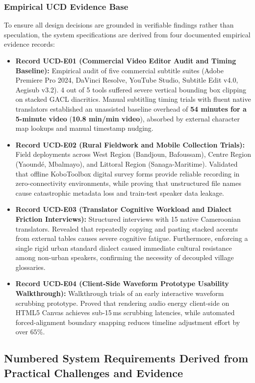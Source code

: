 \documentclass[a4paper,11pt]{article}
\begin{document}
\subsubsection{Empirical UCD Evidence Base}
\label{sec:chap3_ucd_evidence}
To ensure all design decisions are grounded in verifiable findings rather than speculation, the system specifications are derived from four documented empirical evidence records:
\begin{itemize}
    \item \textbf{Record UCD-E01 (Commercial Video Editor Audit and Timing Baseline):} Empirical audit of five commercial subtitle suites (Adobe Premiere Pro 2024, DaVinci Resolve, YouTube Studio, Subtitle Edit v4.0, Aegisub v3.2). 4 out of 5 tools suffered severe vertical bounding box clipping on stacked GACL diacritics. Manual subtitling timing trials with fluent native translators established an unassisted baseline overhead of \textbf{54 minutes for a 5-minute video} (\textbf{10.8 min/min video}), absorbed by external character map lookups and manual timestamp nudging.
    \item \textbf{Record UCD-E02 (Rural Fieldwork and Mobile Collection Trials):} Field deployments across West Region (Bandjoun, Bafoussam), Centre Region (Yaound\'e, Mbalmayo), and Littoral Region (Sanaga-Maritime). Validated that offline KoboToolbox digital survey forms provide reliable recording in zero-connectivity environments, while proving that unstructured file names cause catastrophic metadata loss and train-test speaker data leakage.
    \item \textbf{Record UCD-E03 (Translator Cognitive Workload and Dialect Friction Interviews):} Structured interviews with 15 native Cameroonian translators. Revealed that repeatedly copying and pasting stacked accents from external tables causes severe cognitive fatigue. Furthermore, enforcing a single rigid urban standard dialect caused immediate cultural resistance among non-urban speakers, confirming the necessity of decoupled village glossaries.
    \item \textbf{Record UCD-E04 (Client-Side Waveform Prototype Usability Walkthrough):} Walkthrough trials of an early interactive waveform scrubbing prototype. Proved that rendering audio energy client-side on HTML5 Canvas achieves sub-15\,ms scrubbing latencies, while automated forced-alignment boundary snapping reduces timeline adjustment effort by over $65\%$.
\end{itemize}

\subsection{Numbered System Requirements Derived from Practical Challenges and Evidence}
\label{sec:chap3_requirements}
\end{document}
